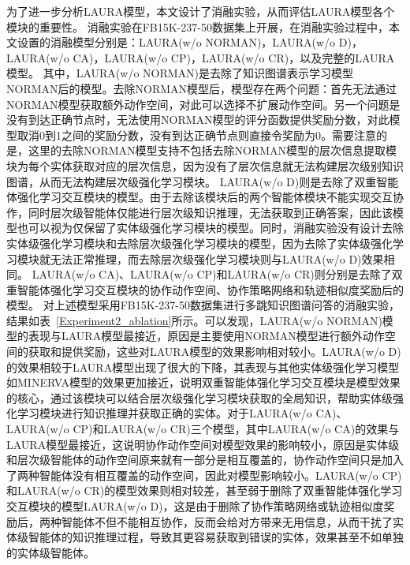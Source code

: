 \documentclass[algorithmlist, AutoFakeBold, AutoFakeSlant, figurelist, tablelist, nomlist, masters]{seuthesix}
\begin{document}
为了进一步分析LAURA模型，本文设计了消融实验，从而评估LAURA模型各个模块的重要性。
消融实验在FB15K-237-50数据集上开展，在消融实验过程中，本文设置的消融模型分别是：LAURA(w/o NORMAN)，LAURA(w/o D)，LAURA(w/o CA)，LAURA(w/o CP)，LAURA(w/o CR)，以及完整的LAURA模型。
其中，LAURA(w/o NORMAN)是去除了知识图谱表示学习模型NORMAN后的模型。去除NORMAN模型后，模型存在两个问题：首先无法通过NORMAN模型获取额外动作空间，对此可以选择不扩展动作空间。另一个问题是没有到达正确节点时，无法使用NORMAN模型的评分函数提供奖励分数，对此模型取消0到1之间的奖励分数，没有到达正确节点则直接令奖励为0。需要注意的是，这里的去除NORMAN模型支持不包括去除NORMAN模型的层次信息提取模块为每个实体获取对应的层次信息，因为没有了层次信息就无法构建层次级别知识图谱，从而无法构建层次级强化学习模块。
LAURA(w/o D)则是去除了双重智能体强化学习交互模块的模型。由于去除该模块后的两个智能体模块不能实现交互协作，同时层次级智能体仅能进行层次级知识推理，无法获取到正确答案，因此该模型也可以视为仅保留了实体级强化学习模块的模型。同时，消融实验没有设计去除实体级强化学习模块和去除层次级强化学习模块的模型，因为去除了实体级强化学习模块就无法正常推理，而去除层次级强化学习模块则与LAURA(w/o D)效果相同。
LAURA(w/o CA)、LAURA(w/o CP)和LAURA(w/o CR)则分别是去除了双重智能体强化学习交互模块的协作动作空间、协作策略网络和轨迹相似度奖励后的模型。
对上述模型采用FB15K-237-50数据集进行多跳知识图谱问答的消融实验，结果如表~\ref{Experiment2_ablation}所示。可以发现，LAURA(w/o NORMAN)模型的表现与LAURA模型最接近，原因是主要使用NORMAN模型进行额外动作空间的获取和提供奖励，这些对LAURA模型的效果影响相对较小。LAURA(w/o D)的效果相较于LAURA模型出现了很大的下降，其表现与其他实体级强化学习模型如MINERVA模型的效果更加接近，说明双重智能体强化学习交互模块是模型效果的核心，通过该模块可以结合层次级强化学习模块获取的全局知识，帮助实体级强化学习模块进行知识推理并获取正确的实体。对于LAURA(w/o CA)、LAURA(w/o CP)和LAURA(w/o CR)三个模型，其中LAURA(w/o CA)的效果与LAURA模型最接近，这说明协作动作空间对模型效果的影响较小，原因是实体级和层次级智能体的动作空间原来就有一部分是相互覆盖的，协作动作空间只是加入了两种智能体没有相互覆盖的动作空间，因此对模型影响较小。LAURA(w/o CP)和LAURA(w/o CR)的模型效果则相对较差，甚至弱于删除了双重智能体强化学习交互模块的模型LAURA(w/o D)，这是由于删除了协作策略网络或轨迹相似度奖励后，两种智能体不但不能相互协作，反而会给对方带来无用信息，从而干扰了实体级智能体的知识推理过程，导致其更容易获取到错误的实体，效果甚至不如单独的实体级智能体。
\end{document}
